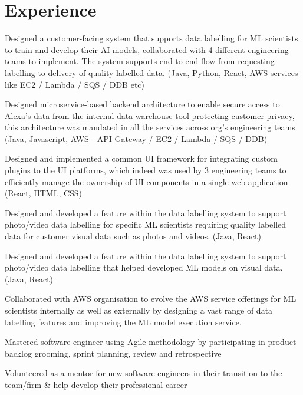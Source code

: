 \documentclass[]{main}
\begin{document}
\begin{minipage}[t]{0.73\textwidth} 


\section{Experience}


\vspace{\topsep} %
\begin{tightemize}
\item Designed a customer-facing system that supports data labelling for ML scientists to train and develop their AI models, collaborated with 4 different engineering teams to implement. The system supports end-to-end flow from requesting labelling to delivery of quality labelled data.  (Java, Python, React, AWS services like EC2 / Lambda / SQS / DDB etc)
\item Designed microservice-based backend architecture to enable secure access to Alexa's data from the internal data warehouse tool protecting customer privacy, this architecture was mandated in all the services across org's engineering teams (Java, Javascript, AWS - API Gateway / EC2 / Lambda / SQS / DDB)
\item Designed and implemented a common UI framework for integrating custom plugins to the UI platforms, which indeed was used by 3 engineering teams to efficiently manage the ownership of UI components in a single web application (React, HTML, CSS)
\item Designed and developed a feature within the data labelling system to support photo/video data labelling for specific ML scientists requiring quality labelled data for customer visual data such as photos and videos. (Java, React)
\item Designed and developed a feature within the data labelling system to support photo/video data labelling that helped developed ML models on visual data. (Java, React)
\item Collaborated with AWS organisation to evolve the AWS service offerings for ML scientists internally as well as externally by designing a vast range of data labelling features and improving the ML model execution service.
\item Mastered software engineer using Agile methodology by participating in product backlog grooming, sprint planning, review and retrospective
\item Volunteered as a mentor for new software engineers in their transition to the team/firm \& help develop their professional career
\end{tightemize}
\sectionsep




\end{minipage}
\end{document}
